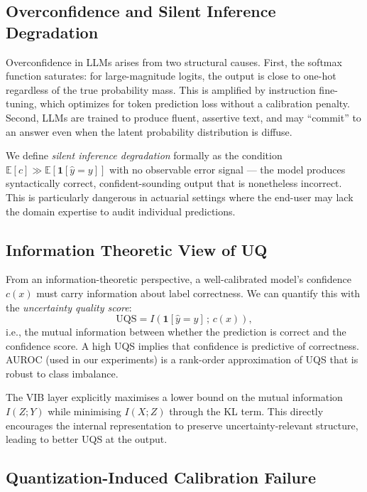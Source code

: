 \documentclass[conference]{IEEEtran}
\begin{document}
\subsection{Overconfidence and Silent Inference Degradation}

Overconfidence in LLMs arises from two structural causes. First,
the softmax function saturates: for large-magnitude logits, the
output is close to one-hot regardless of the true probability mass.
This is amplified by instruction fine-tuning, which optimizes for
token prediction loss without a calibration penalty. Second,
LLMs are trained to produce fluent, assertive text, and may
``commit'' to an answer even when the latent probability distribution
is diffuse.

We define \textit{silent inference degradation} formally as the
condition $\mathbb{E}[c] \gg \mathbb{E}[\mathbf{1}[\hat{y}=y]]$
with no observable error signal --- the model produces syntactically
correct, confident-sounding output that is nonetheless incorrect. This
is particularly dangerous in actuarial settings where the end-user
may lack the domain expertise to audit individual predictions.

\subsection{Information Theoretic View of UQ}

From an information-theoretic perspective, a well-calibrated model's
confidence $c(x)$ must carry information about label correctness. We
can quantify this with the \emph{uncertainty quality score}:
\begin{equation}
    \text{UQS} = I\!\left(\mathbf{1}[\hat{y}=y]\,;\,c(x)\right),
\end{equation}
i.e., the mutual information between whether the prediction is correct
and the confidence score. A high UQS implies that confidence is
predictive of correctness. AUROC (used in our experiments) is a
rank-order approximation of UQS that is robust to class imbalance.

The VIB layer explicitly maximises a lower bound on the mutual
information $I(Z;Y)$ while minimising $I(X;Z)$ through the KL term.
This directly encourages the internal representation to preserve
uncertainty-relevant structure, leading to better UQS at the output.

\subsection{Quantization-Induced Calibration Failure}
\end{document}
